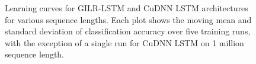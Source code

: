 \documentclass{article}
\begin{document}
\begin{figure}
\begin{minipage}{0.5\textwidth}
  \end{minipage}
  \caption{Learning curves for GILR-LSTM and CuDNN LSTM architectures for various
    sequence lengths. Each plot shows the moving mean and standard deviation of
    classification accuracy over five training runs, with the exception of a single
    run for CuDNN LSTM on 1 million sequence length.}
    \label{fig:synthetic_training}
  \end{figure}


\end{document}
